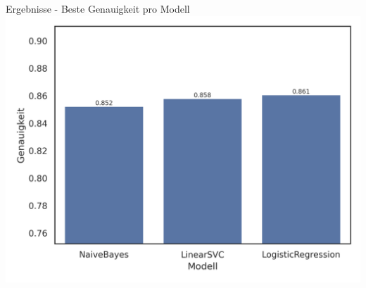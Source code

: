 \documentclass[aspectratio=169]{beamer} %
\begin{document}
\begin{frame}{Ergebnisse - Beste Genauigkeit pro Modell}
    \centering
    \includegraphics[scale=0.65]{../datasets/sentiment140/results/plots/klassische-ml-beste-genauigkeit-pro-modell-truncated-y-axis.png}
\end{frame}





\end{document}
